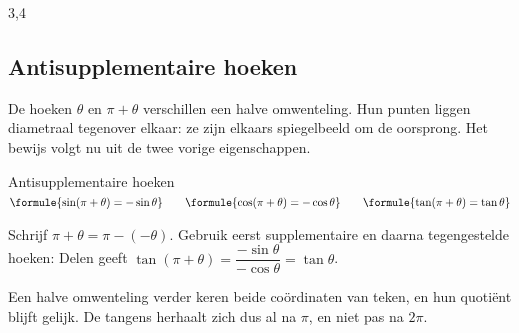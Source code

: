 \begin{oefeningen}
\end{oefeningen}

\begin{alleenvoor}{3,4}
\subsection{Antisupplementaire hoeken}

De hoeken $\theta$ en $\pi + \theta$ verschillen een halve omwenteling. Hun punten liggen diametraal tegenover elkaar: ze zijn elkaars spiegelbeeld om de oorsprong. Het bewijs volgt nu uit de twee vorige eigenschappen.

\begin{theorie}
\begin{stelling}{Antisupplementaire hoeken}
\qquad $\formule{\sin(\pi + \theta) = -\sin\theta} \qquad \formule{\cos(\pi + \theta) = -\cos\theta} \qquad \formule{\tan(\pi + \theta) = \tan\theta}$
\end{stelling}
\begin{bewijs}
Schrijf $\pi + \theta = \pi - (-\theta)$. Gebruik eerst supplementaire en daarna tegengestelde hoeken:
\bewijsregel{\sin(\pi + \theta) = \sin\bigl(\pi - (-\theta)\bigr) = \sin(-\theta) = -\sin\theta}
\bewijsregel{\cos(\pi + \theta) = \cos\bigl(\pi - (-\theta)\bigr) = -\cos(-\theta) = -\cos\theta}
Delen geeft $\tan(\pi + \theta) = \dfrac{-\sin\theta}{-\cos\theta} = \tan\theta$.
\end{bewijs}
\end{theorie}

Een halve omwenteling verder keren beide coördinaten van teken, en hun quotiënt blijft gelijk. De tangens herhaalt zich dus al na $\pi$, en niet pas na $2\pi$.


\begin{oefeningen}
\end{oefeningen}


\end{alleenvoor}
